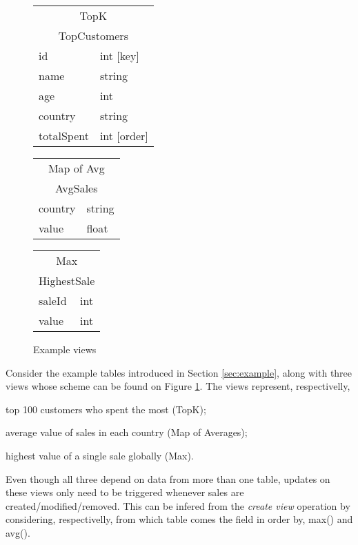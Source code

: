 \documentclass{vldb}
\begin{document}
\begin{figure}
	\centering
	\begin{tabular}{|l|l|}
		\multicolumn{2}{c}{TopK} \\
		\multicolumn{2}{c}{TopCustomers} \\ \hline
		id            & int [key]         \\ \hline
		name          & string       \\ \hline
		age           & int          \\ \hline
		country       & string      \\ \hline
		totalSpent & int [order] \\
		\hline
	\end{tabular} \hspace{0.1em}
	\begin{tabular}{|l|l|}
		\multicolumn{2}{c}{Map of Avg} \\
		\multicolumn{2}{c}{AvgSales} \\ \hline
		country & string \\ \hline
		value        & float  \\
		\hline       
	\end{tabular} \hspace{0.1em}
	\begin{tabular}{|l|l|}
		\multicolumn{2}{c}{Max} \\
		\multicolumn{2}{c}{HighestSale} \\ \hline
		saleId & int \\ \hline
		value & int \\
		\hline      
	\end{tabular}
	\caption{Example views}
	\label{fig:views}
\end{figure}


Consider the example tables introduced in Section \ref{sec:example}, along with three views whose scheme can be found on Figure \ref{fig:views}.
The views represent, respectivelly, 
\begin{enumerate*}[label=(\roman*)]
	\item \label{item:topk} top 100 customers who spent the most (TopK);
	\item \label{item:avg} average value of sales in each country (Map of Averages);
	\item \label{item:max} highest value of a single sale globally (Max).
\end{enumerate*}
Even though all three depend on data from more than one table, updates on these views only need to be triggered whenever sales are created/modified/removed.
This can be infered from the \emph{create view} operation by considering, respectivelly, from which table comes the field in order by, max() and avg().
\end{document}
